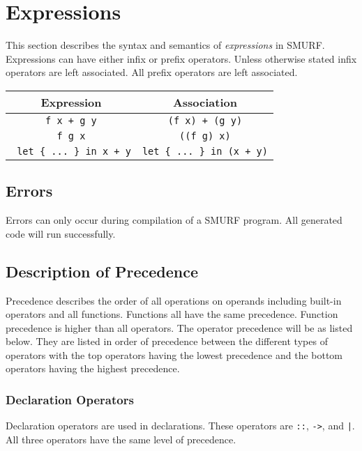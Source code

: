 \section{Expressions}

This section describes the syntax and semantics of \emph{expressions} in 
SMURF. Expressions can have either infix or prefix operators. 
Unless otherwise stated infix operators are left associated. 
All prefix operators are left associated. 


\begin{center}
	\begin{tabular}{|c|c|}
		\hline
		Expression & Association \\
		\hline
		\texttt{f x + g y} & \texttt{(f x) + (g y)} \\
		\texttt{f g x} & \texttt{((f g) x)} \\
		\texttt{ let \{ ... \} in x + y} & \texttt{let \{ ... \} in (x + y)} \\
		\hline
	\end{tabular}
\end{center}


\subsection{Errors}

Errors can only occur during compilation of a SMURF program. All generated 
code will run successfully. 

\subsection{Description of Precedence}
Precedence describes the order of all operations on operands including 
built-in operators and all functions. 
Functions all have the same precedence. 
Function precedence is higher than all
operators. The operator precedence will be as listed below. They are listed 
in order of precedence between the different types of operators with the 
top operators having the lowest precedence and the bottom operators having 
the highest precedence. 

\subsubsection{Declaration Operators}
Declaration operators are used in declarations. These 
operators are \texttt{::}, \texttt{->}, and \texttt{|}. 
All three operators have the same level of precedence. 
